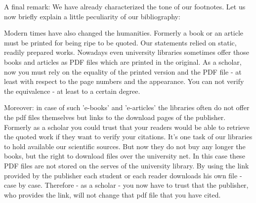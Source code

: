%
%
%
%

%
A final remark: We have already characterized the tone of our footnotes. Let us
now briefly explain a little peculiarity of our bibliography:

Modern times have also changed the humanities. Formerly a book or an article
must be printed for being ripe to be quoted. Our statements relied on static,
readily prepared works. Nowadays even university libraries sometimes offer those
books and articles as PDF files which are printed in the original. As a scholar,
now you must rely on the equality of the printed version and the PDF file - at
least with respect to the page numbers and the appearance. You can not verify the
equivalence - at least to a certain degree.

Moreover: in case of such 'e-books' and 'e-articles' the libraries often do not
offer the pdf files themselves but links to the download pages of the publisher.
Formerly as a scholar you could trust that your readers would be able to
retrieve the quoted work if they want to verify your citations. It's one task of
our libraries to hold available our scientific sources. But now they do not buy
any longer the books, but the right to download files over the university net.
In this case these PDF files are not stored on the serves of the university
library. By using the link provided by the publisher each student or each reader
downloads his own file - case by case. Therefore - as a scholar - you now have
to trust that the publisher, who provides the link, will not change that pdf
file that you have cited.

